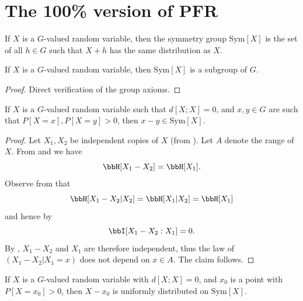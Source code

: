 
\chapter{The 100\% version of PFR}

\begin{definition}\label{sym-group-def}
\leanok
If $X$ is a $G$-valued random variable, then the symmetry group $\mathrm{Sym}[X]$ is the set of all $h \in G$ such that $X +h$ has the same distribution as $X$.
\end{definition}

\begin{lemma}\label{sym-group}
\leanok
If $X$ is a $G$-valued random variable, then $\mathrm{Sym}[X]$ is a subgroup of $G$.
\end{lemma}

\begin{proof}\leanok Direct verification of the group axioms.
\end{proof}

\begin{lemma}\label{zero-large}
  \leanok  If $X$ is a $G$-valued random variable such that
  $d[X ;X]=0$, and $x,y \in G$ are such that $P[X=x], P[X=y]>0$, then $x-y \in \mathrm{Sym}[X]$.
\end{lemma}

\begin{proof}
  \leanok
   Let $X_1,X_2$ be independent copies of $X$ (from ). Let $A$ denote the range of $X$.  From  and  we have
  $$ \bbH[X_1-X_2] = \bbH[X_1].$$
Observe from  that
$$ \bbH[X_1-X_2|X_2] = \bbH[X_1|X_2] = \bbH[X_1]$$
and hence by 
$$ \bbI[X_1-X_2 : X_1] = 0.$$
By , $X_1-X_2$ and $X_1$ are therefore independent, thus the law of $(X_1-X_2|X_1=x)$ does not depend on $x \in A$. The claim follows.
\end{proof}

\begin{lemma}\label{sym-zero}
\leanok
  If $X$ is a $G$-valued random variable with $d[X ;X]=0$, and $x_0$ is a point with $P[X=x_0] > 0$, then $X-x_0$ is uniformly distributed on $\mathrm{Sym}[X]$.
\end{lemma}

